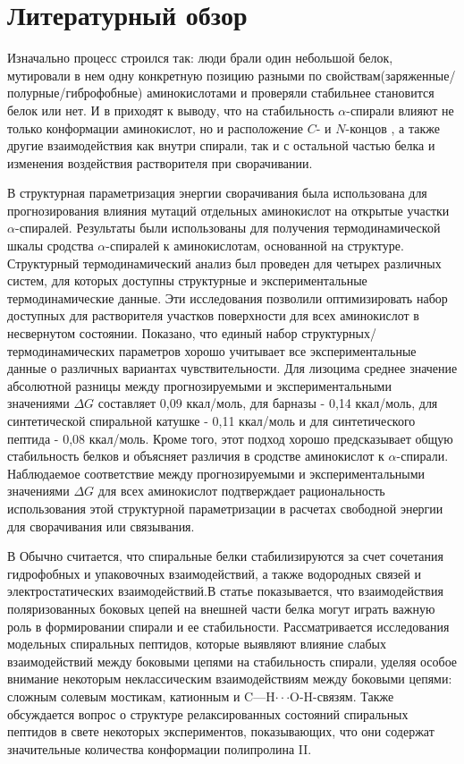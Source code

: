 \documentclass[
11pt,%
tightenlines,%
twoside,%
onecolumn,%
nofloats,%
nobibnotes,%
nofootinbib,%
superscriptaddress,%
noshowpacs,%
centertags]%
{revtex4}
\begin{document}
\section{Литературный обзор}

Изначально процесс строился так: люди брали один небольшой белок, мутировали в нем одну конкретную позицию разными по свойствам(заряженные/полурные/гиброфобные) аминокислотами и проверяли стабильнее становится белок или нет. И в \cite{litlink1} приходят к выводу, что на стабильность $\alpha$-спирали влияют не только конформации аминокислот, но и расположение $C$- и $N$-концов , а также другие взаимодействия как внутри спирали, так и с остальной частью белка и изменения воздействия растворителя при сворачивании. 

В \cite{litlink2} структурная параметризация энергии сворачивания была использована для прогнозирования влияния мутаций отдельных аминокислот на открытые участки $\alpha$-спиралей. Результаты были использованы для получения термодинамической шкалы сродства $\alpha$-спиралей к аминокислотам, основанной на структуре. Структурный термодинамический анализ был проведен для четырех различных систем, для которых доступны структурные и экспериментальные термодинамические данные. 
Эти исследования позволили оптимизировать набор доступных для растворителя участков поверхности для всех аминокислот в несвернутом состоянии. Показано, что единый набор структурных/термодинамических параметров хорошо учитывает все экспериментальные данные о различных вариантах чувствительности. Для лизоцима среднее значение абсолютной разницы между прогнозируемыми и экспериментальными значениями $\Delta G$ составляет 0,09 ккал/моль, для барназы - 0,14 ккал/моль, для синтетической спиральной катушке - 0,11 ккал/моль и для синтетического пептида - 0,08 ккал/моль. Кроме того, этот подход хорошо предсказывает общую стабильность белков и объясняет различия в сродстве аминокислот к $\alpha$-спирали. Наблюдаемое соответствие между прогнозируемыми и экспериментальными значениями $\Delta G$ для всех аминокислот подтверждает рациональность использования этой структурной параметризации в расчетах свободной энергии для сворачивания или связывания.

В \cite{litlink3} Обычно считается, что спиральные белки стабилизируются за счет сочетания гидрофобных и упаковочных взаимодействий, а также водородных связей и электростатических взаимодействий.В статье показывается, что взаимодействия поляризованных боковых цепей на внешней части белка могут играть важную роль в формировании спирали и ее стабильности. Рассматривается исследования модельных спиральных пептидов, которые выявляют влияние слабых взаимодействий между боковыми цепями на стабильность спирали, уделяя особое внимание некоторым неклассическим взаимодействиям между боковыми цепями: сложным солевым мостикам, катионным и C—H$\cdot \cdot \cdot$O-H-связям. Также обсуждается вопрос о структуре релаксированных состояний спиральных пептидов в свете некоторых экспериментов, показывающих, что они содержат значительные количества конформации полипролина II.
\end{document}
